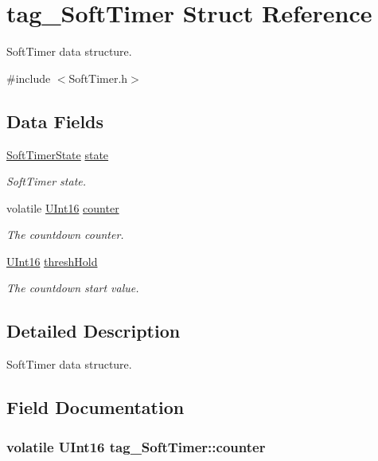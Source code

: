 \hypertarget{structtag___soft_timer}{\section{tag\+\_\+\+Soft\+Timer Struct Reference}
\label{structtag___soft_timer}
}


Soft\+Timer data structure.  




{\ttfamily \#include $<$Soft\+Timer.\+h$>$}

\subsection*{Data Fields}
\begin{DoxyCompactItemize}
\item 
\hyperlink{_soft_timer_8h_a7f078e1503ae2d931bfbc6ada2145fed}{Soft\+Timer\+State} \hyperlink{structtag___soft_timer_af62379b52047ab99128f9a4b62905bc2}{state}
\begin{DoxyCompactList}\small\item\em Soft\+Timer state. \end{DoxyCompactList}\item 
volatile \hyperlink{_types_8h_aad0fc9943ec46ed9388d30c8ebe52b77}{U\+Int16} \hyperlink{structtag___soft_timer_ad35ffa049959bc406243952e7f3e738f}{counter}
\begin{DoxyCompactList}\small\item\em The countdown counter. \end{DoxyCompactList}\item 
\hyperlink{_types_8h_aad0fc9943ec46ed9388d30c8ebe52b77}{U\+Int16} \hyperlink{structtag___soft_timer_aa7b3fcf408e6ac60c9fc94ce0f202285}{thresh\+Hold}
\begin{DoxyCompactList}\small\item\em The countdown start value. \end{DoxyCompactList}\end{DoxyCompactItemize}


\subsection{Detailed Description}
Soft\+Timer data structure. 

\subsection{Field Documentation}
\hypertarget{structtag___soft_timer_ad35ffa049959bc406243952e7f3e738f}{
\subsubsection[{counter}]{\setlength{\rightskip}{0pt plus 5cm}volatile {\bf U\+Int16} tag\+\_\+\+Soft\+Timer\+::counter}}\label{structtag___soft_timer_ad35ffa049959bc406243952e7f3e738f}



